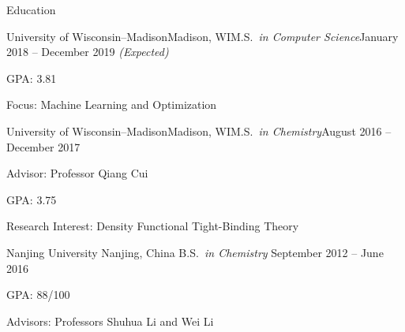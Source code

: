 \documentclass{resume} %
\begin{document}
% 
% 
% 

\begin{rSection}{Education}



\begin {rSubsection}{University of Wisconsin--Madison}{Madison, WI}{M.S.\em\ in Computer Science}{January 2018 -- December 2019 \em(Expected)}
\item GPA: 3.81
\item Focus: Machine Learning and Optimization
\end {rSubsection}


\begin {rSubsection}{University of Wisconsin--Madison}{Madison, WI}{M.S.\em\ in Chemistry}{August 2016 -- December 2017}
\item Advisor: Professor Qiang Cui
\item GPA: 3.75
\item Research Interest: Density Functional Tight-Binding Theory
\end {rSubsection}

\begin {rSubsection}{Nanjing University} {Nanjing, China} {B.S.\em \ in Chemistry} {September 2012 -- June 2016}
\item GPA: 88/100
\item Advisors: Professors Shuhua Li and Wei Li

\end {rSubsection}

\end{rSection}
\end{document}

